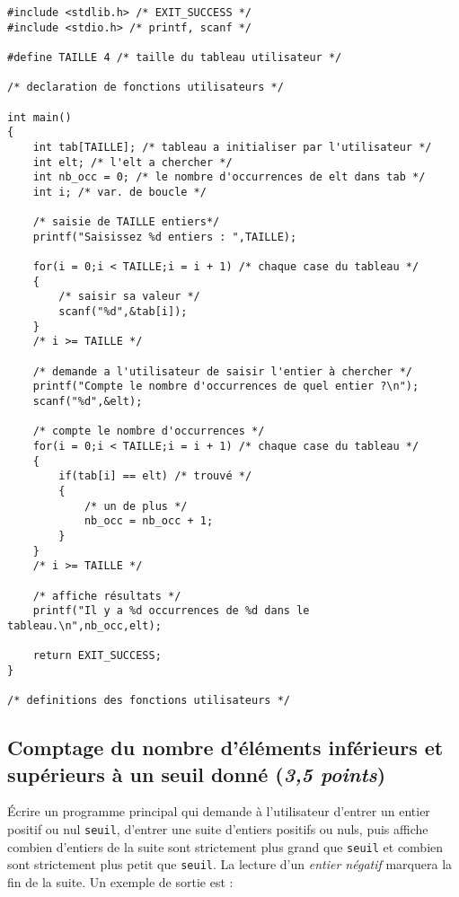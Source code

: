\begin{correction}
\begin{verbatim}
#include <stdlib.h> /* EXIT_SUCCESS */
#include <stdio.h> /* printf, scanf */

#define TAILLE 4 /* taille du tableau utilisateur */

/* declaration de fonctions utilisateurs */

int main()
{
    int tab[TAILLE]; /* tableau a initialiser par l'utilisateur */
    int elt; /* l'elt a chercher */
    int nb_occ = 0; /* le nombre d'occurrences de elt dans tab */
    int i; /* var. de boucle */

    /* saisie de TAILLE entiers*/
    printf("Saisissez %d entiers : ",TAILLE);

    for(i = 0;i < TAILLE;i = i + 1) /* chaque case du tableau */
    {
        /* saisir sa valeur */
        scanf("%d",&tab[i]);
    }
    /* i >= TAILLE */

    /* demande a l'utilisateur de saisir l'entier à chercher */
    printf("Compte le nombre d'occurrences de quel entier ?\n");
    scanf("%d",&elt);

    /* compte le nombre d'occurrences */
    for(i = 0;i < TAILLE;i = i + 1) /* chaque case du tableau */
    {
        if(tab[i] == elt) /* trouvé */
        {
            /* un de plus */
            nb_occ = nb_occ + 1;
        }
    }
    /* i >= TAILLE */

    /* affiche résultats */
    printf("Il y a %d occurrences de %d dans le tableau.\n",nb_occ,elt);

    return EXIT_SUCCESS;
}

/* definitions des fonctions utilisateurs */

\end{verbatim}
\end{correction}

\subsection{Comptage du nombre d'éléments inférieurs et
  supérieurs à un seuil donné (\textit{3,5 points})}

Écrire un programme principal qui demande à l'utilisateur d'entrer un entier
positif ou nul \verb|seuil|, d'entrer une suite d'entiers
positifs ou nuls, puis affiche combien d'entiers de la suite
sont strictement plus grand que \verb|seuil| et combien sont strictement plus
petit que \verb|seuil|. La lecture d'un \textit{entier négatif} marquera la fin de
la suite. Un exemple de sortie est :

